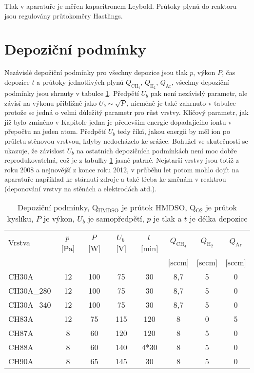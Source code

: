 Tlak v aparatuře je měřen kapacitronem Leybold. Průtoky plynů do reaktoru jsou regulovány průtokoměry Hastlings. 

\section{Depoziční podmínky}

Nezávislé depožiční podmínky pro všechny depozice jsou tlak $p$, výkon $P$, čas depozice $t$ a průtoky jednotlivých plynů $Q_{\mathrm{CH_4}}$, $Q_{\mathrm{H_2}}$, $Q_{\mathrm{Ar}}$, všechny depoziční podmínky jsou shrnuty v tabulce \ref{deppodminky}. Předpětí $U_b$ pak není nezávislý parametr, ale závisí na výkonu přibližně jako $U_b \sim \sqrt{P}$, nicméně je také zahrnuto v tabulce protože se jedná o velmi důležitý parametr pro růst vrstvy. Klíčový parametr, jak již bylo zmíněno v Kapitole jedna je především energie dopadajícího iontu v přepočtu na jeden atom. Předpětí $U_b$ tedy říká, jakou energii by měl ion po průletu stěnovou vrstvou, kdyby nedocházelo ke srážce. Bohužel ve skutečnosti se ukazuje, že závislost $U_b$ na ostatních depozičních podmínkách není moc dobře reprodukovatelná, což je z tabulky \ref{deppodminky} jasně patrné. Nejstarší vrstvy jsou totiž z roku 2008 a nejnovější z konce roku 2012, v průběhu let potom mohlo dojít na aparatuře například ke stárnutí zdroje a také třeba ke změnám v reaktrou (deponování vrstvy na stěnách a elektrodách atd.). 

\begin{table}[htbp]
 \centering
 \begin{tabular}{lccccccc}
	\hline
	{Vrstva} & {$p$\,[Pa]} & {$P$\,[W]} & {$U_b$\,[V]} & {$t$\,[min]} & {$Q_{\mathrm{CH_4}}$} & {$Q_\mathrm{H_2}$} & {$Q_\mathrm{Ar}$} \\
	& & & & & {[sccm]} & {[sccm]} & {[sccm]} \\
	\hline\hline
	CH30A     & 12 & 100 & 75  & 30   & 8,7 & 5 & 0 \\
	CH30A\_280 & 12 & 100 & 75  & 30   & 8,7 & 5 & 0 \\
	CH30A\_340 & 12 & 100 & 75  & 30   & 8,7 & 5 & 0 \\
	CH83A     & 12 & 75  & 115 & 120  & 8   & 0 & 5 \\
	CH87A     & 8  & 60  & 120 & 120  & 8   & 5 & 0 \\
	CH88A     & 8  & 60  & 140 & 4*30 & 8   & 5 & 0	\\
	CH90A     & 8  & 65  & 145 & 30   & 8   & 5 & 0 \\
	\hline
 \end{tabular}
 \caption{Depoziční podmínky, Q$_\mathrm{{HMDSO}}$ je průtok HMDSO, Q$_\mathrm{O2}$ je průtok kyslíku, $P$ je výkon, $U_b$ je samopředpětí, $p$ je tlak a $t$ je délka depozice}
\label{deppodminky}
\end{table}

